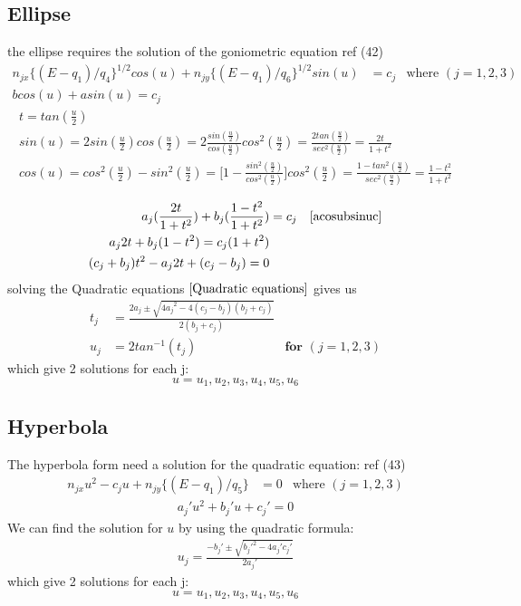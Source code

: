 \documentclass[11pt,a4paper]{article}
\begin{document}
\subsection{Ellipse}
the ellipse requires the solution of the goniometric equation ref (42)
\begin{align}
n_{jx}\{(E-q_1)/q_4 \}^{1/2}cos(u) + n_{jy}\{(E-q_1)/q_6\} ^ {1/2} sin (u)&= c_j&\text{where  } (j = 1,2,3)\\ b cos (u) + a sin (u)  =  c_j \label{acosubsinuc}
\end{align}
\begin{align}
 t = tan ( \frac{u}{2})\\
 sin (u) = 2sin (\frac{u}{2})cos (\frac{u}{2}) = 2 \frac{sin( \frac{u}{2})}{cos (\frac{u}{2})}cos ^2 (\frac{u}{2}) = \frac{2 tan (\frac{u}{2})}{sec ^2 (\frac{u}{2})} = \frac{2t}{1+ t^2} \\
 cos (u) = cos^2 (\frac{u}{2}) - sin^2 (\frac{u}{2}) = \Big[ 1- \frac{sin^2 (\frac{u}{2})}{cos^2 (\frac{u}{2})}\Big]cos^2 (\frac{u}{2}) = \frac{1- tan^2 (\frac{u}{2})}{sec^2 (\frac{u}{2})}  =\frac{1-t^2}{1+t^2}\\
\end{align}
\begin{align}
a_j(\frac{2t}{1+t^2})+ b_j(\frac{1-t^2}{1+t^2}) &= c_j  &\ref{acosubsinuc}\\
a_j2t + b_j(1-t^2) = c_j (1+t^2)\\
(c_j+b_j)t^2 - a_j 2t +(c_j-b_j)= 0 \label{Quadratic equations}
\end{align}
solving the Quadratic equations $\ref{Quadratic equations}$ gives us
\begin{align}
t_j &= \frac{2a_j \pm \sqrt{{4a_j}^2-4(c_j-b_j)(b_j+c_j)}}{2(b_j+c_j)} \\
u_j &= 2tan ^{-1} (t_j) & \textbf{for } (j = 1,2,3)
\end{align}
which give 2 solutions for each j:
\begin{equation}
u = u_1,u_2,u_3,u_4,u_5,u_6
\end{equation}

\subsection{Hyperbola}
The hyperbola form need a solution for the quadratic equation: ref (43)
\begin{align}
n_{jx}u^2 -c_j u + n_{jy}\{(E-q_1)/q_5\} &= 0  &\text{where  } (j = 1,2,3)
\end{align}
\begin{align}
a_j'u^2 + b_j'u + c_j' = 0
\end{align}
We can find the solution for $u$ by using the quadratic formula:
\begin{align}
u_j = \frac{-b_j ' \pm \sqrt{b_j '^2 - 4a_j'c_j'} }{2a_j'}
\end{align}
which give 2 solutions for each j:
\begin{equation}
u = u_1,u_2,u_3,u_4,u_5,u_6
\end{equation}
\end{document}
